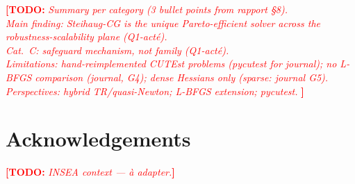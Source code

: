 \documentclass[11pt,a4paper]{article}
\newcommand{\TODO}[1]{\textcolor{red}{\textbf{[TODO:} \textit{#1}\textbf{]}}}
\begin{document}
\TODO{%
  Summary per category (3 bullet points from rapport §8).\\
  Main finding: Steihaug-CG is the unique Pareto-efficient solver across
  the robustness-scalability plane (Q1-acté).\\
  Cat.~C: safeguard mechanism, not family (Q1-acté).\\
  Limitations: hand-reimplemented CUTEst problems (pycutest for journal);
  no L-BFGS comparison (journal, G4); dense Hessians only (sparse: journal G5).\\
  Perspectives: hybrid TR/quasi-Newton; L-BFGS extension; pycutest.
}

\section*{Acknowledgements}
\TODO{INSEA context --- à adapter.}



\end{document}

